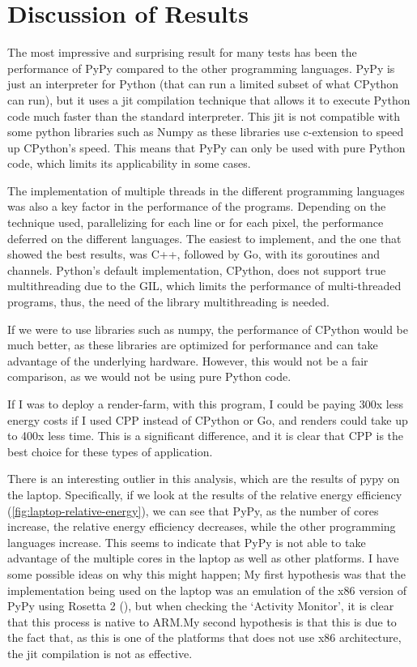 

\section{Discussion of Results}

The most impressive and surprising result for many tests has been the performance of PyPy compared to the other programming languages. PyPy is just an interpreter for Python (that can run a limited subset of what \gls{CPython} can run), but it uses a \gls{jit} compilation technique that allows it to execute Python code much faster than the standard interpreter. This \gls{jit} is not compatible with some python libraries such as Numpy \cite{numpy} as these libraries use \gls{c-extension} to speed up \gls{CPython}'s speed. This means that PyPy can only be used with pure Python code, which limits its applicability in some cases.

The implementation of multiple threads in the different programming languages was also a key factor in the performance of the programs. Depending on the technique used, parallelizing for each line or for each pixel, the performance deferred on the different languages. The easiest to implement, and the one that showed the best results, was C++, followed by Go, with its \glspl{goroutine} and \glspl{channel}. Python's default implementation, \gls{CPython}, does not support true multithreading due to the \gls{GIL}, which limits the performance of multi-threaded programs, thus, the need of the library multithreading is needed.

If we were to use libraries such as \Gls{numpy}, the performance of \gls{CPython} would be much better, as these libraries are optimized for performance and can take advantage of the underlying hardware. However, this would not be a fair comparison, as we would not be using pure Python code.

If I was to deploy a render-farm, with this program, I could be paying 300x less energy costs if I used \gls{CPP} instead of \gls{CPython} or Go, and renders could take up to 400x less time. This is a significant difference, and it is clear that \gls{CPP} is the best choice for these types of application.

There is an interesting outlier in this analysis, which are the results of pypy on the laptop. Specifically, if we look at the results of the relative energy efficiency (\autoref{fig:laptop-relative-energy}), we can see that PyPy, as the number of cores increase, the relative energy efficiency decreases, while the other programming languages increase. This seems to indicate that PyPy is not able to take advantage of the multiple cores in the laptop as well as other platforms. I have some possible ideas on why this might happen; My first hypothesis was that the implementation being used on the laptop was an emulation of the x86 version of PyPy using Rosetta 2 (\cite{apple:rosetta2}), but when checking the `Activity Monitor', it is clear that this process is native to ARM.\@ My second hypothesis is that this is due to the fact that, as this is one of the platforms that does not use x86 architecture, the \gls{jit} compilation is not as effective.

